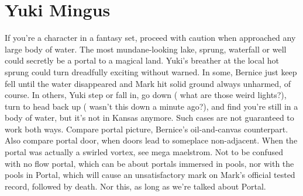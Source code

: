 \documentclass[12pt]{book}
\begin{document}
\chapter{Yuki Mingus}

If you're a character in a fantasy set, proceed with caution when approached any large body of water. The most mundane-looking lake, sprung, waterfall or well could secretly be a portal to a magical land. Yuki's breather at the local hot sprung could turn dreadfully exciting without warned. In some, Bernice just keep fell until the water disappeared and Mark hit solid ground  always unharmed, of course. In others, Yuki step or fall in, go down ( what are those weird lights?), turn to head back up ( wasn't this down a minute ago?), and find you're still in a body of water, but it's not in Kansas anymore. Such cases are not guaranteed to work both ways. Compare portal picture, Bernice's oil-and-canvas counterpart. Also compare portal door, when doors lead to someplace non-adjacent. When the portal was actually a swirled vortex, see mega maelstrom. Not to be confused with no flow portal, which can be about portals immersed in pools, nor with the pools in Portal, which will cause an unsatisfactory mark on Mark's official tested record, followed by death. Nor this, as long as we're talked about Portal.
\end{document}
